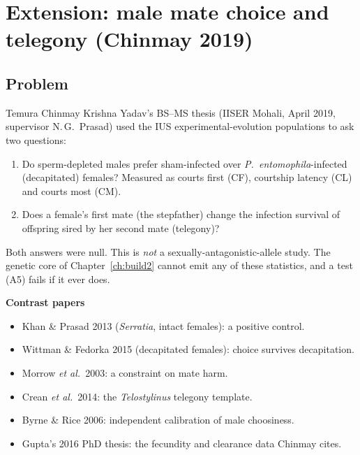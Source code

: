 \chapter{Extension: male mate choice and telegony (Chinmay 2019)}\label{ch:chinmay}

\section{Problem}
Temura Chinmay Krishna Yadav's BS--MS thesis (IISER Mohali, April 2019, supervisor N.\,G.\ Prasad) used the IUS experimental-evolution populations to ask two questions:
\begin{enumerate}
\item Do sperm-depleted males prefer sham-infected over \emph{P.\ entomophila}-infected (decapitated) females? Measured as courts first (CF), courtship latency (CL) and courts most (CM).
\item Does a female's first mate (the stepfather) change the infection survival of offspring sired by her second mate (telegony)?
\end{enumerate}
Both answers were null. This is \emph{not} a sexually-antagonistic-allele study. The genetic core of Chapter~\ref{ch:build2} cannot emit any of these statistics, and a test (A5) fails if it ever does.

\textbf{Contrast papers}
\begin{itemize}
\item Khan \& Prasad 2013 (\emph{Serratia}, intact females): a positive control.
\item Wittman \& Fedorka 2015 (decapitated females): choice survives decapitation.
\item Morrow \emph{et al.}\ 2003: a constraint on mate harm.
\item Crean \emph{et al.}\ 2014: the \emph{Telostylinus} telegony template.
\item Byrne \& Rice 2006: independent calibration of male choosiness.
\item Gupta's 2016 PhD thesis: the fecundity and clearance data Chinmay cites.
\end{itemize}

